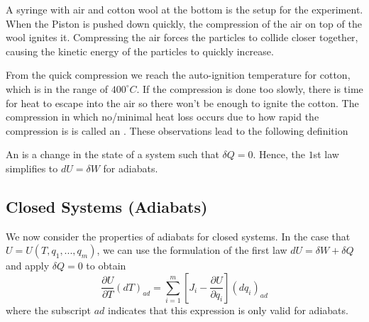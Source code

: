 \documentclass[12pt, a4paper, oneside, openright, titlepage]{book}
\begin{document}
A syringe with air and cotton wool at the bottom is the setup for the experiment. When the Piston is pushed down quickly, the compression of the air on top of the wool ignites it. Compressing the air forces the particles to collide closer together, causing the kinetic energy of the particles to quickly increase. 

From the quick compression we reach the auto-ignition temperature for cotton, which is in the range of $400^{\circ}C$. If the compression is done too slowly, there is time for heat to escape into the air so there won't be enough to ignite the cotton. The compression in which no/minimal heat loss occurs due to how rapid the compression is is called an . These observations lead to the following definition 

\begin{defn}
    An  is a change in the state of a system such that $\delta Q = 0$. Hence, the $1$st law simplifies to $dU = \delta W$ for adiabats.
\end{defn}

\subsection{Closed Systems (Adiabats)}


We now consider the properties of adiabats for closed systems. In the case that $U = U(T,q_1,...,q_m)$, we can use the formulation of the first law $dU = \delta W + \delta Q$ and apply $\delta Q = 0$ to obtain \begin{equation*}
    \frac{\partial U}{\partial T}(dT)_{ad} = \sum_{i=1}^m\left[J_i - \frac{\partial U}{\partial q_i}\right](dq_i)_{ad}
\end{equation*}
where the subscript $ad$ indicates that this expression is only valid for adiabats. 
\end{document}
